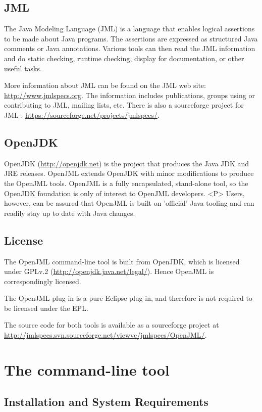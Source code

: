 \documentclass{report}%
\begin{document}
\section{JML}

The Java Modeling Language (JML) is a language that enables logical assertions
to be made about Java programs. The assertions are expressed as structured 
Java comments or Java annotations. Various tools can then read the JML 
information and do static checking, runtime checking, display for documentation,
or other useful tasks.

More information about JML can be found on the JML web site: 
\url{http://www.jmlspecs.org}.
The information includes publications, groups using or contributing to JML, 
mailing lists, etc.
There is also a sourceforge project for JML : \url{https://sourceforge.net/projects/jmlspecs/}.

\section{OpenJDK}

OpenJDK (\url{http://openjdk.net}) is the project that produces the Java JDK and JRE releases.
OpenJML extends OpenJDK with minor modifications to produce the OpenJML tools. OpenJML is a 
fully encapsulated, stand-alone tool, so the OpenJDK foundation is only of interest to OpenJML developers.
<P>
Users, however, can be assured that OpenJML is built on 'official' Java tooling and can readily stay up 
to date with Java changes.

\section{License}

The OpenJML command-line tool is built from OpenJDK, which is licensed under GPLv.2 (\url{http://openjdk.java.net/legal/}).
Hence OpenJML is correspondingly licensed.

The OpenJML plug-in is a pure Eclipse plug-in, and therefore is not required to be licensed under the EPL.


The source code for both tools is available as a sourceforge project at
\url{http://jmlspecs.svn.sourceforge.net/viewvc/jmlspecs/OpenJML/}.


\chapter{The command-line tool}
\section{Installation and System Requirements}
\end{document}
